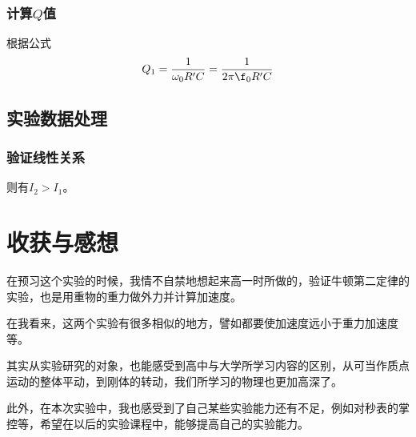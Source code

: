\documentclass{ctexart}
\begin{document}
\subsubsection{计算$Q$值}
根据公式$$Q_1=\frac{1}{\omega_0R'C}=\frac{1}{2\pi\f_0R'C}$$

      \subsection{实验数据处理}
      \subsubsection{验证线性关系}
     
      则有$I_2>I_1$。
      \section{收获与感想}
      在预习这个实验的时候，我情不自禁地想起来高一时所做的，验证牛顿第二定律的实验，也是用重物的重力做外力并计算加速度。

      在我看来，这两个实验有很多相似的地方，譬如都要使加速度远小于重力加速度等。

      其实从实验研究的对象，也能感受到高中与大学所学习内容的区别，从可当作质点运动的整体平动，到刚体的转动，我们所学习的物理也更加高深了。

      此外，在本次实验中，我也感受到了自己某些实验能力还有不足，例如对秒表的掌控等，希望在以后的实验课程中，能够提高自己的实验能力。
\end{document}
